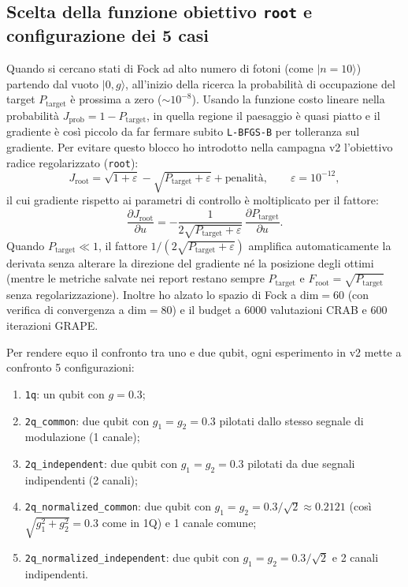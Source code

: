 \documentclass[11pt,a4paper]{article}
\begin{document}
\subsection*{Scelta della funzione obiettivo \texttt{root} e configurazione dei 5 casi}
Quando si cercano stati di Fock ad alto numero di fotoni (come $|n=10\rangle$) partendo dal vuoto $|0,g\rangle$, all'inizio della ricerca la probabilità di occupazione del target $P_{\text{target}}$ è prossima a zero ($\sim 10^{-8}$). Usando la funzione costo lineare nella probabilità $J_{\text{prob}} = 1 - P_{\text{target}}$, in quella regione il paesaggio è quasi piatto e il gradiente è così piccolo da far fermare subito \texttt{L-BFGS-B} per tolleranza sul gradiente. Per evitare questo blocco ho introdotto nella campagna v2 l'obiettivo radice regolarizzato (\texttt{root}):
\begin{equation}
    J_{\text{root}} = \sqrt{1 + \varepsilon} - \sqrt{P_{\text{target}} + \varepsilon} + \text{penalità}, \qquad \varepsilon = 10^{-12},
\end{equation}
il cui gradiente rispetto ai parametri di controllo è moltiplicato per il fattore:
\begin{equation}
    \frac{\partial J_{\text{root}}}{\partial u} = -\frac{1}{2\sqrt{P_{\text{target}} + \varepsilon}}\,\frac{\partial P_{\text{target}}}{\partial u}.
\end{equation}
Quando $P_{\text{target}} \ll 1$, il fattore $1/(2\sqrt{P_{\text{target}} + \varepsilon})$ amplifica automaticamente la derivata senza alterare la direzione del gradiente né la posizione degli ottimi (mentre le metriche salvate nei report restano sempre $P_{\text{target}}$ e $F_{\text{root}} = \sqrt{P_{\text{target}}}$ senza regolarizzazione). Inoltre ho alzato lo spazio di Fock a $\text{dim}=60$ (con verifica di convergenza a $\text{dim}=80$) e il budget a 6000 valutazioni CRAB e 600 iterazioni GRAPE.

\medskip
\noindent
Per rendere equo il confronto tra uno e due qubit, ogni esperimento in v2 mette a confronto 5 configurazioni:
\begin{enumerate}
    \item \texttt{1q}: un qubit con $g = 0.3$;
    \item \texttt{2q\_common}: due qubit con $g_1 = g_2 = 0.3$ pilotati dallo stesso segnale di modulazione (1 canale);
    \item \texttt{2q\_independent}: due qubit con $g_1 = g_2 = 0.3$ pilotati da due segnali indipendenti (2 canali);
    \item \texttt{2q\_normalized\_common}: due qubit con $g_1 = g_2 = 0.3/\sqrt{2} \approx 0.2121$ (così $\sqrt{g_1^2+g_2^2} = 0.3$ come in 1Q) e 1 canale comune;
    \item \texttt{2q\_normalized\_independent}: due qubit con $g_1 = g_2 = 0.3/\sqrt{2}$ e 2 canali indipendenti.
\end{enumerate}
\end{document}
